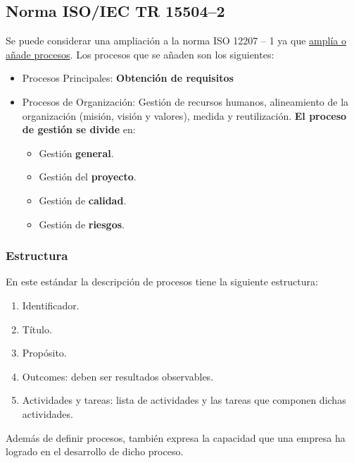 \subsection{Norma ISO/IEC TR 15504--2}
Se puede considerar una ampliación a la norma ISO 12207 – 1 ya que \uline{amplía o añade procesos}. Los procesos que se añaden son los siguientes:



\begin{itemize}
    \item Procesos Principales: \textbf{Obtención de requisitos}
    \item Procesos de Organización: Gestión de recursos humanos, alineamiento de la organización (misión, visión y valores), medida y reutilización. \textbf{El proceso de gestión se divide} en:
          \begin{itemize}
              \item Gestión \textbf{general}.
              \item Gestión del \textbf{proyecto}.
              \item Gestión de \textbf{calidad}.
              \item Gestión de \textbf{riesgos}.
          \end{itemize}
\end{itemize}

\subsubsection{Estructura}
En este estándar la descripción de procesos tiene la siguiente estructura:
\begin{enumerate} %
    \item Identificador. %
    \item Título.%
    \item Propósito.%
    \item Outcomes: deben ser resultados observables.
    \item Actividades y tareas: lista de actividades y las tareas que componen dichas actividades.
\end{enumerate}
Además de definir procesos, también expresa la capacidad que una empresa ha logrado en el desarrollo de dicho proceso.\\



